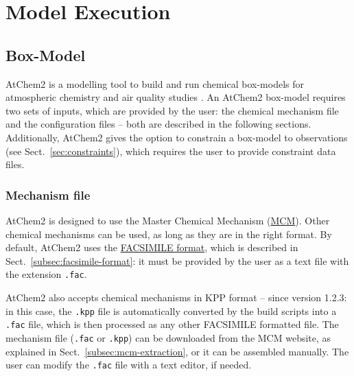 %
%
%
%

\chapter{Model Execution} \label{ch:execution}

\section{Box-Model} \label{sec:box-model}

AtChem2 is a modelling tool to build and run chemical box-models for
atmospheric chemistry and air quality studies \citep{sommariva_2020}.
An AtChem2 box-model requires two sets of inputs, which are provided
by the user: the chemical mechanism file and the configuration files
-- both are described in the following sections. Additionally, AtChem2
gives the option to constrain a box-model to observations (see
Sect.~\ref{sec:constraints}), which requires the user to provide
constraint data files.

\subsection{Mechanism file} \label{subsec:mechanism-file}

AtChem2 is designed to use the Master Chemical Mechanism
(\href{https://mcm.york.ac.uk/MCM}{MCM}). Other chemical mechanisms
can be used, as long as they are in the right format. By default,
AtChem2 uses the \hyperref[subsec:facsimile-format]{FACSIMILE format},
which is described in Sect.~\ref{subsec:facsimile-format}: it must be
provided by the user as a text file with the extension \texttt{.fac}.

AtChem2 also accepts chemical mechanisms in KPP format -- since
version 1.2.3: in this case, the \texttt{.kpp} file is automatically
converted by the build scripts into a \texttt{.fac} file, which is
then processed as any other FACSIMILE formatted file. The mechanism
file (\texttt{.fac} or \texttt{.kpp}) can be downloaded from the MCM
website, as explained in Sect.~\ref{subsec:mcm-extraction}, or it can
be assembled manually. The user can modify the \texttt{.fac} file with
a text editor, if needed.

